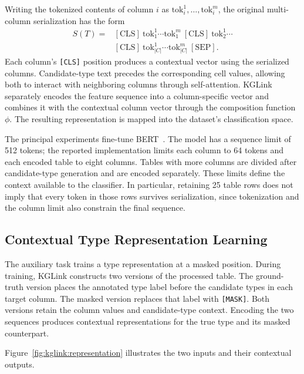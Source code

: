 Writing the tokenized contents of column $i$ as $\mathrm{tok}_i^1,\ldots,\mathrm{tok}_i^{m}$, the original multi-column serialization has the form
\begin{equation}
\begin{split}
S(T)={}&[\mathrm{CLS}]\ \mathrm{tok}_1^1\cdots\mathrm{tok}_1^m\ 
[\mathrm{CLS}]\ \mathrm{tok}_2^1\cdots\\
&[\mathrm{CLS}]\ \mathrm{tok}_{|C|}^1\cdots\mathrm{tok}_{|C|}^m\ 
[\mathrm{SEP}].
\end{split}
\label{eq:kglink:serialization}
\end{equation}
Each column's \texttt{[CLS]} position produces a contextual vector using the serialized columns. Candidate-type text precedes the corresponding cell values, allowing both to interact with neighboring columns through self-attention. KGLink separately encodes the feature sequence into a column-specific vector and combines it with the contextual column vector through the composition function $\phi$. The resulting representation is mapped into the dataset's classification space.

The principal experiments fine-tune BERT~\cite{kglink-devlin2018bert}. The model has a sequence limit of 512 tokens; the reported implementation limits each column to 64 tokens and each encoded table to eight columns. Tables with more columns are divided after candidate-type generation and are encoded separately. These limits define the context available to the classifier. In particular, retaining 25 table rows does not imply that every token in those rows survives serialization, since tokenization and the column limit also constrain the final sequence.

\subsection{Contextual Type Representation Learning}
\label{sec:kglink:representation}

The auxiliary task trains a type representation at a masked position. During training, KGLink constructs two versions of the processed table. The ground-truth version places the annotated type label before the candidate types in each target column. The masked version replaces that label with \texttt{[MASK]}. Both versions retain the column values and candidate-type context. Encoding the two sequences produces contextual representations for the true type and its masked counterpart.

Figure~\ref{fig:kglink:representation} illustrates the two inputs and their contextual outputs.

